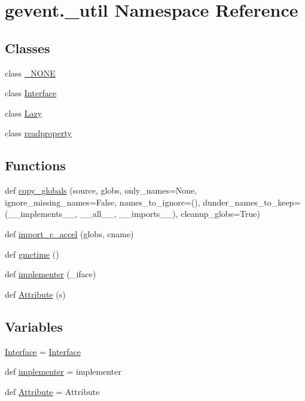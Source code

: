 \hypertarget{namespacegevent_1_1__util}{}\section{gevent.\+\_\+util Namespace Reference}
\label{namespacegevent_1_1__util}
\subsection*{Classes}
\begin{DoxyCompactItemize}
\item 
class \hyperlink{classgevent_1_1__util_1_1___n_o_n_e}{\+\_\+\+N\+O\+NE}
\item 
class \hyperlink{classgevent_1_1__util_1_1_interface}{Interface}
\item 
class \hyperlink{classgevent_1_1__util_1_1_lazy}{Lazy}
\item 
class \hyperlink{classgevent_1_1__util_1_1readproperty}{readproperty}
\end{DoxyCompactItemize}
\subsection*{Functions}
\begin{DoxyCompactItemize}
\item 
def \hyperlink{namespacegevent_1_1__util_a84388abb8007bba4ac72f0bc1eee09d8}{copy\+\_\+globals} (source, globs, only\+\_\+names=None, ignore\+\_\+missing\+\_\+names=False, names\+\_\+to\+\_\+ignore=(), dunder\+\_\+names\+\_\+to\+\_\+keep=(\textquotesingle{}\+\_\+\+\_\+implements\+\_\+\+\_\+\textquotesingle{}, \textquotesingle{}\+\_\+\+\_\+all\+\_\+\+\_\+\textquotesingle{}, \textquotesingle{}\+\_\+\+\_\+imports\+\_\+\+\_\+\textquotesingle{}), cleanup\+\_\+globs=True)
\item 
def \hyperlink{namespacegevent_1_1__util_ac0783dd92855b27c01bdd8b204f5abbd}{import\+\_\+c\+\_\+accel} (globs, cname)
\item 
def \hyperlink{namespacegevent_1_1__util_a79e0064c3ee2539fa1b95eb55b69a7c3}{gmctime} ()
\item 
def \hyperlink{namespacegevent_1_1__util_a121bd451a484928258a7fea1f9960223}{implementer} (\+\_\+iface)
\item 
def \hyperlink{namespacegevent_1_1__util_a5adf631bc83884e0b9073c856e2fe07d}{Attribute} (s)
\end{DoxyCompactItemize}
\subsection*{Variables}
\begin{DoxyCompactItemize}
\item 
\hyperlink{namespacegevent_1_1__util_a231456433d7274d08f3c446f53133abb}{Interface} = \hyperlink{classgevent_1_1__util_1_1_interface}{Interface}
\item 
def \hyperlink{namespacegevent_1_1__util_a8b453b4274318a8f654fbbcf666000df}{implementer} = implementer
\item 
def \hyperlink{namespacegevent_1_1__util_a26eb10e4b3e847eca144e5288d204fec}{Attribute} = Attribute
\end{DoxyCompactItemize}


